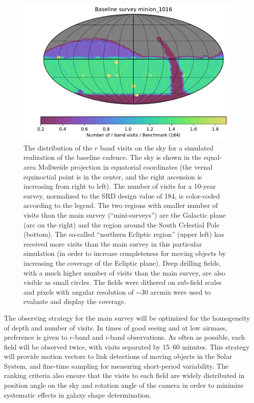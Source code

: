 \begin{figure}
\includegraphics[width=1.0\hsize,clip]{nvisit_minion1016}
\vskip -0.01in
\caption{The distribution of the $r$ band visits on the sky for a simulated
realization of the baseline cadence. The sky is shown in the equal-area Mollweide
projection in equatorial coordinates (the vernal equinoctial point is in the center, and
the right ascension is increasing from right to left). The number of visits for
a 10-year survey, normalized to the SRD design value of 184, is color-coded according
to the legend. The two regions with smaller number of visits than the main survey
(``mini-surveys'') are the Galactic plane (arc on the right) and the region around the
South Celestial Pole (bottom). The so-called ``northern Ecliptic region'' (upper left)
has received more visits than the main survey in this particular simulation (in
order to increase completeness for moving objects by increasing the coverage of
the Ecliptic plane). Deep drilling fields, with a much higher number of visits than
the main survey, are also visible as small circles. The fields were dithered on
sub-field scales and pixels with angular resolution of $\sim$30 arcmin were used
to evaluate and display the coverage.}
\label{Fig:rbandSky}
\end{figure}

The observing strategy for the main survey will be optimized for the homogeneity
of depth and number of visits. In times of good seeing and at low airmass, preference
is given to $r$-band and $i$-band observations. As often as possible, each field will be
observed twice, with visits separated by 15--60 minutes. This strategy will provide motion
vectors to link detections of moving objects in the Solar System, and fine-time sampling
for measuring short-period variability. The ranking criteria also ensure that the
visits to each field are widely distributed in position angle on the sky and
rotation angle of the camera in order to minimize systematic effects in galaxy shape
determination.

